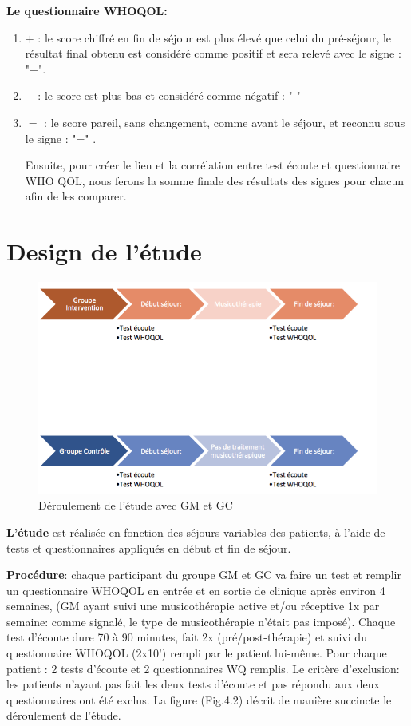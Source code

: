 \textbf{Le questionnaire WHOQOL:} 	
\begin{enumerate}
\item$+$  :  le score chiffré  en fin de séjour est plus élevé
que celui du
pré-séjour, le résultat final obtenu est considéré comme
positif et sera relevé  avec le signe : "+". 
\item $-$ : le score est plus bas et considéré comme négatif : "-"  
\item$=$ : le score pareil, sans changement,  comme avant le séjour, et reconnu sous le signe :  "=" .

Ensuite, pour créer le lien et la corrélation entre test écoute et questionnaire WHO QOL, nous ferons la 
somme finale des résultats des signes pour chacun afin de les comparer.
\end{enumerate}


  \clearpage
\section{Design de l'étude}




\begin{figure}%
	\centering
	\includegraphics[width=1\linewidth]{images/Groupecontrole.png}
	\caption[Schéma du déroulement]{Déroulement de l'étude avec GM et GC}
	
\end{figure}

\textbf{L'étude} est
réalisée en fonction des séjours variables des patients, à l'aide de tests et questionnaires appliqués en 
début
et fin de séjour.

\textbf{Procédure}: chaque participant du groupe GM et GC va faire  un
test et remplir un questionnaire  WHOQOL en entrée et en sortie de
clinique  après environ 4 semaines, (GM ayant suivi une musicothérapie active et/ou réceptive 1x par
semaine:  comme signalé, le type de musicothérapie n'était pas imposé).
Chaque test d'écoute dure
70 à 90 minutes, fait 2x (pré/post-thérapie) et
suivi du questionnaire WHOQOL (2x10') rempli par le
patient lui-même.
Pour chaque patient : 2 tests d'écoute et 2 
questionnaires WQ 
remplis. Le critère d'exclusion: les patients n'ayant pas fait les deux tests d'écoute et pas répondu aux 
deux 
questionnaires ont été exclus.
La  figure (Fig.4.2) décrit de manière succincte le déroulement de
l'étude. 

